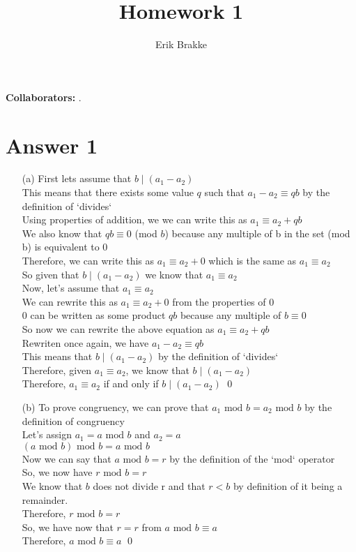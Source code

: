 \documentclass[11pt]{article}
\providecommand{\myparab}[1]{\smallskip\noindent\textbf{#1} }
\theoremstyle{definition}
\begin{document}
\title{Homework 1}
\author{Erik Brakke}
\maketitle

\thispagestyle{fancy}

\myparab{Collaborators: }  .
 
 
\section*{Answer 1}
\begin{enumerate}
	\item[(a)]
	First lets assume that $b \mid (a_1 - a_2)$\\
	This means that there exists some value $q$ such that $a_1 - a_2 \equiv qb$ by the definition of `divides`\\
	Using properties of addition, we we can write this as $a_1 \equiv a_2 + qb$\\
	We also know that $qb \equiv 0$ (mod $b$) because any multiple of b in the set (mod b) is equivalent to 0\\
	Therefore, we can write this as $a_1 \equiv a_2 + 0$ which is the same as $a_1 \equiv a_2$\\
	So given that $b \mid (a_1 - a_2)$ we know that $a_1 \equiv a_2$\\
	Now, let's assume that $a_1 \equiv a_2$\\
	We can rewrite this as $a_1 \equiv a_2 + 0$ from the properties of 0\\
	0 can be written as some product $qb$ because any multiple of $b \equiv 0$\\
	So now we can rewrite the above equation as $a_1 \equiv a_2 + qb$\\
	Rewriten once again, we have $a_1 - a_2 \equiv qb$\\
	This means that $b \mid (a_1 - a_2)$ by the definition of `divides`\\
	Therefore, given $a_1 \equiv a_2$, we know that $b \mid (a_1 - a_2)$\\
	Therefore, $a_1 \equiv a_2$ if and only if $b \mid (a_1 - a_2)$ \qed

	\item[(b)]
	To prove congruency, we can prove that $a_1 \text{ mod } b = a_2 \text{ mod } b$ by the definition of congruency\\
	Let's assign $a_1 = a \text{ mod } b$ and $a_2 = a$\\
	$(a \text{ mod } b) \text{ mod } b = a \text{ mod } b$\\
	Now we can say that $a \text{ mod } b = r$ by the definition of the `mod` operator\\
	So, we now have $r \text{ mod } b = r$\\
	We know that $b$ does not divide r and that $r < b$ by definition of it being a remainder.\\
	Therefore, $r \text{ mod } b = r$\\
	So, we have now that $r = r$ from $a \text{ mod } b \equiv a$\\
	Therefore, $a \text{ mod } b \equiv a$ \qed


\end{enumerate}
\end{document}
